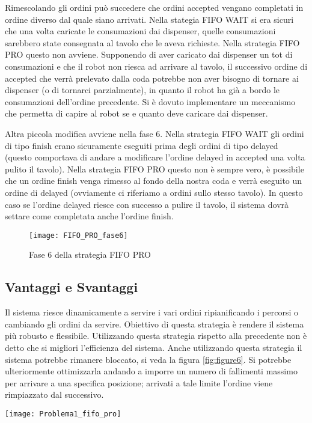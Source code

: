 Rimescolando gli ordini può succedere che ordini accepted vengano completati in ordine diverso dal quale siano arrivati. Nella stategia FIFO WAIT si era sicuri che una volta caricate le consumazioni dai dispenser, quelle consumazioni sarebbero state consegnata al tavolo che le aveva richieste. Nella strategia FIFO PRO questo non avviene. Supponendo di aver caricato dai dispenser un tot di consumazioni e che il robot non riesca ad arrivare al tavolo, il successivo ordine di accepted che verrà prelevato dalla coda potrebbe non aver bisogno di tornare ai dispenser (o di tornarci parzialmente), in quanto il robot ha già a bordo le consumazioni dell'ordine precedente. Si è dovuto implementare un meccanismo che permetta di capire al robot se e quanto deve caricare dai dispenser.

Altra piccola modifica avviene nella fase 6. Nella strategia FIFO WAIT gli ordini di tipo finish erano sicuramente eseguiti prima degli ordini di tipo delayed (questo comportava di andare a modificare l'ordine delayed in accepted una volta pulito il tavolo). Nella strategia FIFO PRO questo non è sempre vero, è possibile che un ordine finish venga rimesso al fondo della nostra coda e verrà eseguito un ordine di delayed (ovviamente ci riferiamo a ordini sullo stesso tavolo). In questo caso se l'ordine delayed riesce con successo a pulire il tavolo, il sistema dovrà settare come completata anche l'ordine finish.

\begin{figure}[htp]
  \texttt{[image: FIFO\_PRO\_fase6]}
  \caption{Fase 6 della strategia FIFO PRO}
  \label{fig:figure5}
\end{figure}

\subsection{Vantaggi e Svantaggi}
Il sistema riesce dinamicamente a servire i vari ordini ripianificando i percorsi o cambiando gli ordini da servire. Obiettivo di questa strategia è rendere il sistema più robusto e flessibile. Utilizzando questa strategia rispetto alla precedente non è detto che si migliori l'efficienza del sistema.
Anche utilizzando questa strategia il sistema potrebbe rimanere bloccato, si veda la figura \ref{fig:figure6}. Si potrebbe ulteriormente ottimizzarla andando a imporre un numero di fallimenti massimo per arrivare a una specifica posizione; arrivati a tale limite l'ordine viene rimpiazzato dal successivo.

\begin{SCfigure}[]
\centering
\texttt{[image: Problema1\_fifo\_pro]}
\caption{In questo esempio il robot vuole arrivare al TD e continuerà a spostarsi dalla cella (9,6) alla (7,4) e viceversa. Ricordiamo che il robot del mondo conosce solo lo stato delle 9 celle adiacenti a lui e le posizioni dei dispenser e dei tavoli. Quando si trova nella cella (7,4) non sa che nella (9,5) c'è una persona e quindi astar pianifica verso quella destinazione.}
\label{fig:figure6}
\end{SCfigure}

